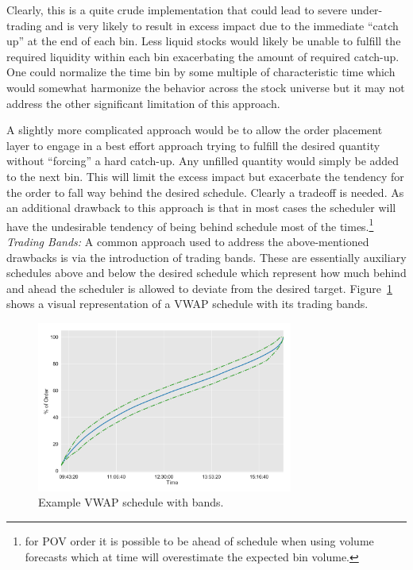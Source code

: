 Clearly, this is a quite crude implementation that could lead to severe under-trading and is very likely to result in excess impact due to the immediate ``catch up'' at the end of each bin. Less liquid stocks would likely be unable to fulfill the required liquidity within each bin exacerbating the amount of required catch-up. One could normalize the time bin by some multiple of characteristic time which would somewhat harmonize the behavior across the stock universe but it may not address the other significant limitation of this approach.


A slightly more complicated approach would be to allow the order placement layer to engage in a best effort approach trying to fulfill the desired quantity without ``forcing'' a hard catch-up. Any unfilled quantity would simply be added to the next bin. This will limit the excess impact but exacerbate the tendency for the order to fall way behind the desired schedule. Clearly a tradeoff is needed. As an additional drawback to this approach is that in most cases the scheduler will have the undesirable tendency of being behind schedule most of the times.\footnote{for POV order it is possible to be ahead of schedule when using volume forecasts which at time will overestimate the expected bin volume.} \\


\noindent\emph{Trading Bands:} A common approach used to address the above-mentioned drawbacks is via the introduction of trading bands. These are essentially auxiliary schedules above and below the desired schedule which represent how much behind and ahead the scheduler is allowed to deviate from the desired target. Figure~\ref{fig:schedule} shows a visual representation of a VWAP schedule with its trading bands. 


	\begin{figure}[!ht]
	\centering
	\includegraphics[width=0.75\textwidth]{chapters/chapter_exec_models/figures/schedule.png} 
	\caption{Example VWAP schedule with bands.\label{fig:schedule}}
	\end{figure}


